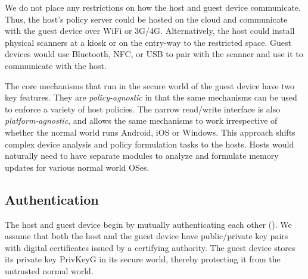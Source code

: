 We do not place any restrictions on how the host and guest device communicate.
Thus, the host's policy server could be hosted on the cloud and communicate
with the guest device over WiFi or 3G/4G. Alternatively, the host could install
physical scanners at a kiosk or on the entry-way to the restricted space.  Guest
devices would use Bluetooth, NFC, or USB to pair with the scanner and use it to
communicate with the host.

The core mechanisms that run in the secure world of the guest device have two
key features. They are \textit{policy-agnostic} in that the same mechanisms can
be used to enforce a variety of host policies. The narrow read/write interface
is also \textit{platform-agnostic}, and allows the same mechanisms to work
irrespective of whether the normal world runs Android, iOS or Windows. This
approach shifts complex device analysis and policy formulation tasks to the
hosts. Hosts would naturally need to have separate modules to analyze and
formulate memory updates for various normal world OSes.

\subsection{Authentication}
\label{section:mechanism:auth}
\newcommand{\ks}{$k_s$}
\newcommand{\pub}[1]{{\sf PubKey#1}}
\newcommand{\prv}[1]{{\sf PrivKey#1}}
\newcommand{\enc}[2]{\textsf{Enc}$_{#1}$(#2)}
\newcommand{\cert}[1]{\textsf{Certificate}(#1)}

The host and guest device begin by mutually authenticating each other
(). We assume that both the host and the guest
device have public/private key pairs with digital certificates issued by a
certifying authority. The guest device stores its private key \prv{G} in its
secure world, thereby protecting it from the untrusted normal world. 

